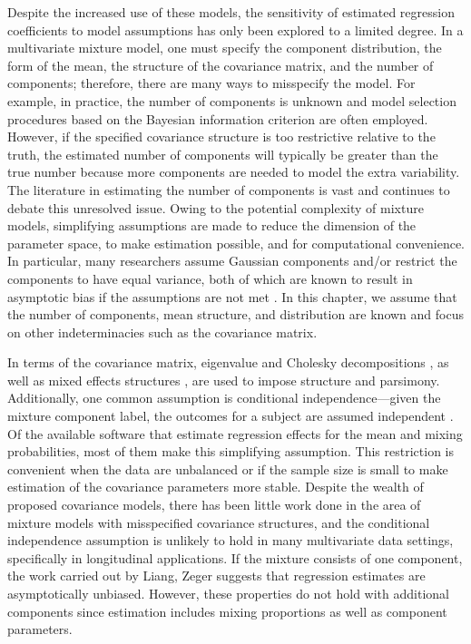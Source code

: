  Despite the increased use of these models, the sensitivity of estimated regression coefficients to model assumptions has only been explored to a limited degree. In a multivariate mixture model, one must specify the component distribution, the form of the mean, the structure of the covariance matrix, and the number of components; therefore, there are many ways to misspecify the model. For example, in practice, the number of components is unknown and model selection procedures based on the Bayesian information criterion are often employed. However, if the specified covariance structure is too restrictive relative to the truth, the estimated number of components will typically be greater than the true number because more components are needed to model the extra variability. The literature in estimating the number of components is  vast \cite{oliveira2005} and continues to debate this unresolved issue. Owing to the potential complexity of mixture models, simplifying assumptions are made to reduce the dimension of the parameter space, to make estimation possible, and for computational convenience. In particular, many researchers assume Gaussian components and/or restrict the components to have equal variance, both of which are known to result in asymptotic bias if the assumptions are not met \cite{gray1994, lo2011}. In this chapter, we assume that the number of components, mean structure, and distribution are known and focus on other indeterminacies such as the covariance matrix.
 
In terms of the covariance matrix, eigenvalue and Cholesky decompositions \cite{banfield1993,mcnicholas2010}, as well as mixed effects structures \cite{muthen1999}, are used to impose structure and parsimony. Additionally, one common assumption is conditional independence---given the mixture component label, the outcomes for a subject are assumed independent \cite{ostbye2011,muthen2008}. Of the available software that estimate regression effects for the mean and mixing probabilities, most of them make this simplifying assumption. This restriction is convenient when the data are unbalanced or if the sample size is small to make estimation of the covariance parameters more stable. Despite the wealth of proposed covariance models, there has been little work done in the area of mixture models with misspecified covariance structures, and the conditional independence assumption is unlikely to hold in many multivariate data settings, specifically in longitudinal applications. If the mixture consists of one component, the work carried out by Liang, Zeger \cite{liang1986} suggests that regression estimates are asymptotically unbiased. However, these properties do not hold with additional components since estimation includes mixing proportions as well as component parameters. 

